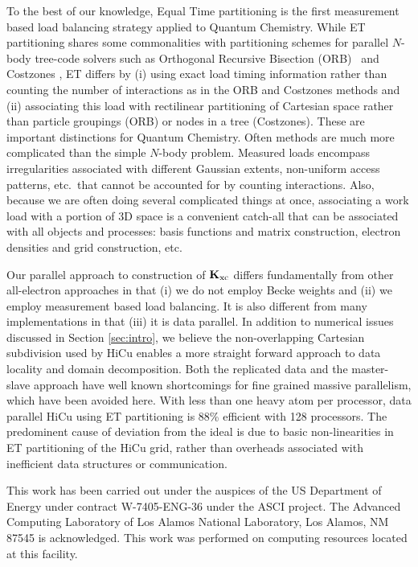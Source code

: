 \commentoutA{\documentclass[prb,aps,twocolumn,twocolumngrid]{revtex4}}
\newcommand{\Kxc}{{\bf K}_{\mathrm{xc}}}
\begin{document}
To the best of our knowledge, Equal Time partitioning is the first
measurement based load balancing strategy applied to Quantum
Chemistry.  While ET partitioning shares some commonalities with
partitioning schemes for parallel $N$-body tree-code solvers such as
Orthogonal Recursive Bisection (ORB)~\cite{warren:92_article} and
Costzones \cite{Singh93}, ET differs by (i) using exact load timing
information rather than counting the number of interactions as in the
ORB and Costzones methods and (ii) associating this load with
rectilinear partitioning of Cartesian space rather than particle
groupings (ORB) or nodes in a tree (Costzones).  These are important
distinctions for Quantum Chemistry.  Often methods are much more
complicated than the simple $N$-body problem.  Measured loads
encompass irregularities associated with different Gaussian extents,
non-uniform access patterns, etc.~that cannot be accounted for by
counting interactions.  Also, because we are often doing several
complicated things at once, associating a work load with a portion of
3D space is a convenient catch-all that can be associated with all
objects and processes: basis functions and matrix construction,
electron densities and grid construction, etc.

Our parallel approach to construction of $\Kxc$ differs fundamentally
from other all-electron approaches in that (i) we do not employ Becke
weights and (ii) we employ measurement based load balancing.  It is
also different from many implementations in that (iii) it is data
parallel.  In addition to numerical issues discussed in Section
\ref{sec:intro}, we believe the non-overlapping Cartesian subdivision
used by HiCu enables a more straight forward approach to data locality
and domain decomposition.  Both the replicated data and the
master-slave approach have well known shortcomings for fine grained
massive parallelism, which have been avoided here.  With less than one
heavy atom per processor, data parallel HiCu using ET partitioning is
88\% efficient with 128 processors.  The predominent cause of
deviation from the ideal is due to basic non-linearities in ET
partitioning of the HiCu grid, rather than overheads associated with
inefficient data structures or communication.

\begin{acknowledgments}
This work has been carried out under the auspices of the US Department
of Energy under contract W-7405-ENG-36 under the ASCI project.  The
Advanced Computing Laboratory of Los Alamos National Laboratory, Los
Alamos, NM 87545 is acknowledged.  This work was performed on
computing resources located at this facility.
\end{acknowledgments}
\end{document}
